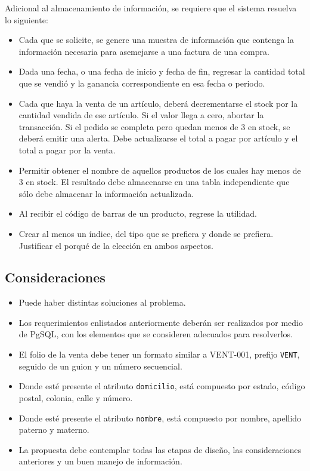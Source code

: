 \documentclass[10pt,openany]{book}
\begin{document}
Adicional al almacenamiento de información, se requiere que el sistema resuelva lo siguiente:

\begin{itemize}
    \item Cada que se solicite, se genere una muestra de información que contenga la información necesaria para asemejarse a una factura de una compra.
    \item Dada una fecha, o una fecha de inicio y fecha de fin, regresar la cantidad total que se vendió y la ganancia correspondiente en esa fecha o periodo.
    \item Cada que haya la venta de un artículo, deberá decrementarse el stock por la cantidad vendida de ese artículo. Si el valor llega a cero, abortar la transacción. Si el pedido se completa pero quedan menos de 3 en stock, se deberá emitir una alerta. Debe actualizarse el total a pagar por artículo y el total a pagar por la venta.
    \item Permitir obtener el nombre de aquellos productos de los cuales hay menos de 3 en stock. El resultado debe almacenarse en una tabla independiente que sólo debe almacenar la información actualizada.
    \item Al recibir el código de barras de un producto, regrese la utilidad.
    \item Crear al menos un índice, del tipo que se prefiera y donde se prefiera. Justificar el porqué de la elección en ambos aspectos.
\end{itemize}

\subsection{Consideraciones}
\begin{itemize}
    \item Puede haber distintas soluciones al problema.
    \item Los requerimientos enlistados anteriormente deberán ser realizados por medio de PgSQL, con los elementos que se consideren adecuados para resolverlos.
    \item El folio de la venta debe tener un formato similar a VENT-001, prefijo \texttt{VENT}, seguido de un guion y un número secuencial.
    \item Donde esté presente el atributo \texttt{domicilio}, está compuesto por estado, código postal, colonia, calle y número.
    \item Donde esté presente el atributo \texttt{nombre}, está compuesto por nombre, apellido paterno y materno.
    \item La propuesta debe contemplar todas las etapas de diseño, las consideraciones anteriores y un buen manejo de información.
\end{itemize}
\end{document}
